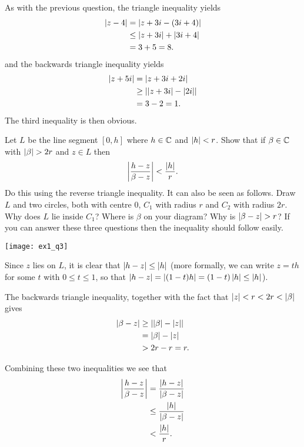 \begin{questions}
\begin{answer}
As with the previous question, the triangle inequality yields
\begin{align*}
\left| z-4 \right| & = \left| z+3i-(3i+4) \right| \\
& \leq \left| z+3i \right| + \left| 3i+4 \right| \\
&=3+5=8.
\end{align*}
and the backwards triangle inequality yields
\begin{align*}
\left| z+5i \right| & = \left| z+3i+2i \right| \\
& \geq \left|  \left| z+3i \right| - \left| 2i \right|  \right| \\
&=3-2=1.
\end{align*}
The third inequality is then obvious.
\end{answer}
\question Let $L$ be the line segment $[0,h]$ where $h \in \mathbb{C}$ and $\left| h \right| < r$.  Show that if $\beta \in \mathbb{C}$ with $\abs{\beta}>2r$ and $z \in L$ then
\[
\left| \frac{h-z}{\beta-z} \right| < \frac{\left| h \right|}{r}.
\]
Do this using the reverse triangle inequality.  It can also be seen as follows.  Draw $L$ and two circles, both with centre $0$, $C_1$ with radius $r$ and $C_2$ with radius $2r$.  Why does $L$ lie inside $C_1$?  Where is $\beta$ on your diagram?  Why is $\abs{\beta-z}>r$?  If you can answer these three questions then the inequality should follow easily.
\begin{answer}

\begin{center}
\texttt{[image: ex1\_q3]}
\end{center}
Since $z$ lies on $L$, it is clear that $\left| h-z \right| \leq \left| h \right|$ (more formally, we can write $z=th$ for some $t$ with $0 \leq t \leq 1$, so that $\left| h-z \right| = \left| (1-t)h \right| = (1-t) \left| h \right| \leq \left| h \right|$).

The backwards triangle inequality, together with the fact that $\left| z \right|<r<2r<\left| \beta \right|$ gives
\begin{align*}
\left| \beta - z \right| & \geq \left| \left| \beta \right|-\left| z \right| \right| \\
& = \left| \beta \right| - \left| z \right| \\
&> 2r-r = r.
\end{align*}

Combining these two inequalities we see that
\begin{align*}
\left|  \frac{h-z}{\beta - z}  \right| &= \frac{\left| h-z \right|}{\left| \beta -z \right|} \\
 & \leq \frac{\left| h \right|}{\left| \beta - z \right|} \\
 & < \frac{\left| h \right|}{r}.
\end{align*}


\end{answer}
\end{questions}
